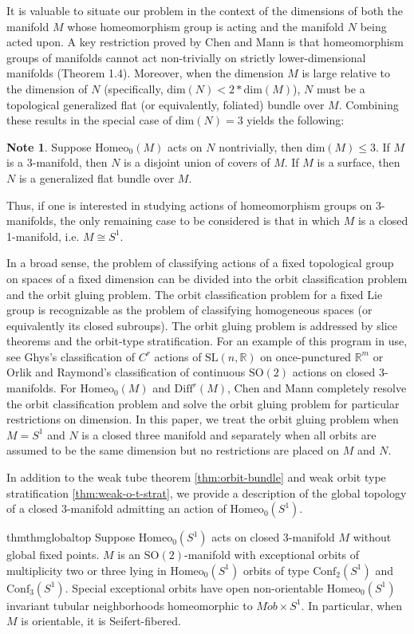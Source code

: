\documentclass[10pt, oneside]{article}
\newcommand{\R}{\mathbb{R}}
\newcommand{\SO}[1][2]{\text{SO}(#1)}
\newcommand{\homeo}[1][S^1]{\text{Homeo}_0(#1)}
\newcommand{\diffr}[1][M]{\text{Diff}^r(#1)}
\newcommand{\conf}[2][S^1]{\text{Conf}_{#2}(#1)}
\newcommand{\SL}[1][2]{\text{SL}(#1, \R)}
\newcommand{\dimn}[1]{\text{dim}(#1)}
\theoremstyle{definition}
\newtheorem*{note*}{Note}
\theoremstyle{definition}
\begin{document}
It is valuable to situate our problem in the context of the dimensions of both the manifold $M$ whose homeomorphism group is acting and the manifold $N$ being acted upon. A key restriction proved by Chen and Mann \cite{chen:StructureTheorems} is that homeomorphism groups of manifolds cannot act non-trivially on strictly lower-dimensional manifolds (Theorem 1.4). Moreover, when the dimension $M$ is large relative to the dimension of $N$ (specifically, $\dimn{N} < 2*\dimn{M}$), $N$ must be a topological generalized flat (or equivalently, foliated) bundle over $M$. Combining these results in the special case of $\dimn{N} = 3$ yields the following:
\begin{note*}
    Suppose $\homeo[M]$ acts on $N$ nontrivially, then $\dimn{M}\leq 3$. If $M$ is a 3-manifold, then $N$ is a disjoint union of covers of $M$. If $M$ is a surface, then $N$ is a generalized flat bundle over $M$.
\end{note*}
\noindent Thus, if one is interested in studying actions of homeomorphism groups on 3-manifolds, the only remaining case to be considered is that in which $M$ is a closed 1-manifold, i.e. $M\cong S^1$.

In a broad sense, the problem of classifying actions of a fixed topological group on spaces of a fixed dimension can be divided into the orbit classification problem and the orbit gluing problem. The orbit classification problem for a fixed Lie group is recognizable as the problem of classifying homogeneous spaces (or equivalently its closed subroups). The orbit gluing problem is addressed by slice theorems and the orbit-type stratification. For an example of this program in use, see Ghys's classification of $C^r$ actions of $\SL[n]$ on once-punctured $\R^m$\cite{cairns:LocalLinearization} or Orlik and Raymond's classification of continuous $\SO$ actions on closed 3-manifolds\cite{orlik:ActionsSO2}. For $\homeo[M]$ and $\diffr$, Chen and Mann completely resolve the orbit classification problem and solve the orbit gluing problem for particular restrictions on dimension. In this paper, we treat the orbit gluing problem when $M= S^1$ and $N$ is a closed three manifold and separately when all orbits are assumed to be the same dimension but no restrictions are placed on $M$ and $N$.

In addition to the weak tube theorem \cref{thm:orbit-bundle} and weak orbit type stratification \cref{thm:weak-o-t-strat}, we provide a description of the global topology of a closed 3-manifold admitting an action of $\homeo$.
\begin{restatable}{thm}{thmglobaltop}
    \label{thm:3mfld-global-top}
    Suppose $\homeo$ acts on closed 3-manifold $M$ without global fixed points. $M$ is an $\SO[2]$-manifold with exceptional orbits of multiplicity two or three lying in $\homeo$ orbits of type $\conf[S^1]{2}$ and $\conf[S^1]{3}$. Special exceptional orbits have open non-orientable $\homeo$ invariant tubular neighborhoods homeomorphic to $M\ddot{o}b\times S^1$. In particular, when $M$ is orientable, it is Seifert-fibered.
\end{restatable}
\end{document}
